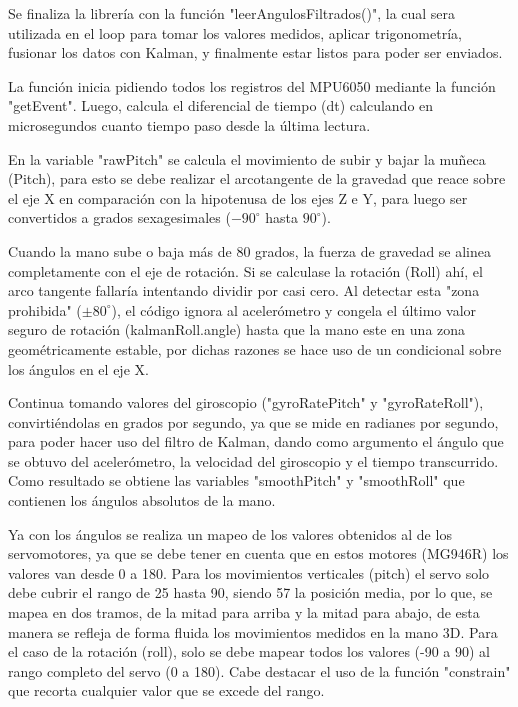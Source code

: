 \documentclass[10pt]{article}
\begin{document}
Se finaliza la librería con la función "leerAngulosFiltrados()", la cual sera utilizada en el loop para tomar los valores medidos, aplicar trigonometría, fusionar los datos con Kalman, y finalmente estar listos para poder ser enviados. 

La función inicia pidiendo todos los registros del MPU6050 mediante la función "getEvent". Luego, calcula el diferencial de tiempo (dt) calculando en microsegundos cuanto tiempo paso desde la última lectura. 

En la variable "rawPitch" se calcula el movimiento de subir y bajar la muñeca (Pitch), para esto se debe realizar el arcotangente de la gravedad que reace sobre el eje X en comparación con la hipotenusa de los ejes Z e Y, para luego ser convertidos a grados sexagesimales ($-90^\circ$ hasta $ 90^\circ$).

Cuando la mano sube o baja más de 80 grados, la fuerza de gravedad se alinea completamente con el eje de rotación. Si se calculase la rotación (Roll) ahí, el arco tangente fallaría intentando dividir por casi cero. Al detectar esta "zona prohibida" ($\pm 80^\circ$), el código ignora al acelerómetro y congela el último valor seguro de rotación (kalmanRoll.angle) hasta que la mano este en una zona geométricamente estable, por dichas razones se hace uso de un condicional sobre los ángulos en el eje X.

Continua tomando valores del giroscopio ("gyroRatePitch" y "gyroRateRoll"), convirtiéndolas en grados por segundo, ya que se mide en radianes por segundo, para poder hacer uso del filtro de Kalman, dando como argumento el ángulo que se obtuvo del acelerómetro, la velocidad del giroscopio y el tiempo transcurrido. Como resultado se obtiene las variables "smoothPitch" y "smoothRoll" que contienen los ángulos absolutos de la mano. 

Ya con los ángulos se realiza un mapeo de los valores obtenidos al de los servomotores, ya que se debe tener en cuenta que en estos motores (MG946R) los valores van desde 0 a 180. Para los movimientos verticales (pitch) el servo solo debe cubrir el rango de 25 hasta 90, siendo 57 la posición media, por lo que, se mapea en dos tramos, de la mitad para arriba y la mitad para abajo, de esta manera se refleja de forma fluida los movimientos medidos en la mano 3D. Para el caso de la rotación (roll), solo se debe mapear todos los valores (-90 a 90) al rango completo del servo (0 a 180). Cabe destacar el uso de la función "constrain" que recorta cualquier valor que se excede del rango. 
\end{document}
